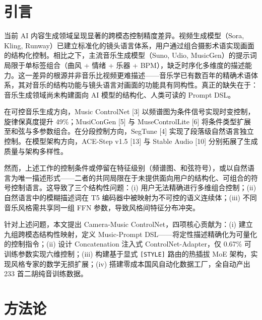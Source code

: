 \documentclass[twocolumn, a4paper, 10pt]{ctexart}
\begin{document}

\section{引言}

当前 AI 内容生成领域呈现显著的跨模态控制精度差异。视频生成模型（Sora, Kling, Runway）已建立标准化的镜头语言体系，用户通过组合摄影术语实现画面的结构化控制。相比之下，主流音乐生成模型（Suno, Udio, MusicGen）的提示词局限于单标签组合（曲风 + 情绪 + 乐器 + BPM），缺乏时序化多维度的描述能力。这一差异的根源并非音乐比视频更难描述——音乐学已有数百年的精确术语体系，其对音乐的结构功能与镜头语言对画面的功能具有同构性。真正的缺失在于：音乐生成领域尚未构建面向 AI 模型的结构化、人类可读的 Prompt DSL。

在可控音乐生成方向，Music ControlNet [3] 以频谱图为条件信号实现时变控制，旋律保真度提升 49\%；MusiConGen [5] 与 MuseControlLite [6] 将条件类型扩展至和弦与多参数组合。在分段控制方向，SegTune [4] 实现了段落级自然语言独立控制。在模型架构方向，ACE-Step v1.5 [13] 与 Stable Audio [10] 分别拓展了生成质量与架构多样性。


然而，上述工作的控制条件或停留在特征级别（频谱图、和弦符号），或以自然语言为唯一描述形式——二者的共同局限在于未提供面向用户的结构化、可组合的符号控制语言。这导致了三个结构性问题：(i) 用户无法精确进行多维组合控制；(ii) 自然语言中的模糊描述词在 T5 编码器中被映射为不可控的语义连续体；(iii) 不同音乐风格需共享同一组 FFN 参数，导致风格间特征分布冲突。

针对上述问题，本文提出 Camera-Music ControlNet，四项核心贡献为：(i) 建立九组跨模态结构性映射，定义 Music-Prompt DSL——将定性描述精确化为可量化的控制指令；(ii) 设计 Concatenation 注入式 ControlNet-Adapter，仅 0.67\% 可训练参数实现六维控制；(iii) 构建基于显式 \texttt{[STYLE]} 路由的热插拔 MoE 架构，实现风格专家的数学无损扩展；(iv) 搭建零成本国风自动化数据工厂，全自动产出 233 首二胡纯音训练数据。

\section{方法论}
\end{document}
